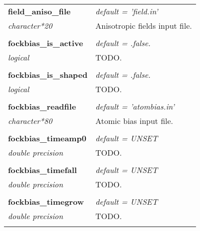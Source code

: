 \begin{Spacing}{1.0}
\begin{longtable}{ p{} p{} }
   \textbf{field\_aniso\_file}
   &  \textit{default = 'field.in'}
   \\*\textit{character*20}
   & Anisotropic fields input file.\\* \\

   \textbf{fockbias\_is\_active}
   &  \textit{default = .false. }
   \\*\textit{logical}
   & TODO.\\* \\

   \textbf{fockbias\_is\_shaped}
   &  \textit{default = .false. }
   \\*\textit{logical}
   & TODO.\\* \\

   \textbf{fockbias\_readfile}
   &  \textit{default = 'atombias.in'}
   \\*\textit{character*80}
   & Atomic bias input file.\\* \\

   \textbf{fockbias\_timeamp0}
   &  \textit{default = UNSET}
   \\*\textit{double precision}
   & TODO.\\* \\

   \textbf{fockbias\_timefall}
   &  \textit{default = UNSET}
   \\*\textit{double precision}
   & TODO.\\* \\

   \textbf{fockbias\_timegrow}
   &  \textit{default = UNSET}
   \\*\textit{double precision}
   & TODO.\\* \\

\end{longtable}
\end{Spacing}
